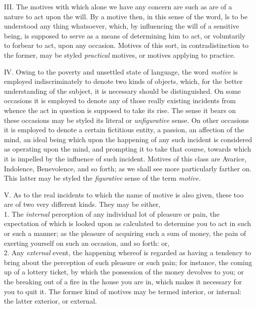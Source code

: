 \documentclass[12pt]{report}
\begin{document}
III. The motives with which alone we have any concern are such as are of
a nature to act upon the will. By a motive then, in this sense of the
word, ls to be understood any thing whatsoever, which, by influencing
the will of a sensitive being, is supposed to serve as a means of
determining him to act, or voluntarily to forbear to act, upon any
occasion. Motives of this sort, in contradistinction to the former, may
be styled \emph{practical} motives, or motives applying to practice.

IV. Owing to the poverty and unsettled state of language, the word
\emph{motive} is employed indiscriminately to denote two kinds of
objects, which, for the better understanding of the subject, it is
necessary should be distinguished. On some occasions it is employed to
denote any of those really existing incidents from whence the act in
question is supposed to take its rise. The sense it bears on these
occasions may be styled its literal or \emph{unfigurative} sense. On
other occasions it is employed to denote a certain fictitious entity, a
passion, an affection of the mind, an ideal being which upon the
happening of any such incident is considered as operating upon the mind,
and prompting it to take that course, towards which it is impelled by
the influence of such incident. Motives of this class are Avarice,
Indolence, Benevolence, and so forth; as we shall see more particularly
farther on. This latter may be styled the \emph{figurative} sense of the
term \emph{motive.}

V. As to the real incidents to which the name of motive is also given,
these too are of two very different kinds. They may be either,\\
1. The \emph{internal} perception of any individual lot of pleasure or
pain, the expectation of which is looked upon as calculated to determine
you to act in such or such a manner; as the pleasure of acquiring such a
sum of money, the pain of exerting yourself on such an occasion, and so
forth: or,\\
2. Any \emph{external} event, the happening whereof is regarded as
having a tendency to bring about the perception of such pleasure or such
pain; for instance, the coming up of a lottery ticket, by which the
possession of the money devolves to you; or the breaking out of a fire
in the house you are in, which makes it necessary for you to quit it.
The former kind of motives may be termed interior, or internal: the
latter exterior, or external.
\end{document}
